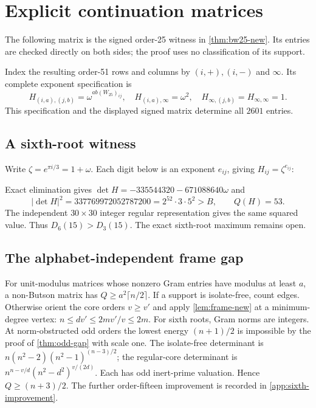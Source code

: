 \section{Explicit continuation matrices}\label{app:explicit-new}
The following matrix is the signed order-25 witness in \cref{thm:bw25-new}. Its entries are checked directly on both sides; the proof uses no classification of its support.
\begin{center}
\setlength{\arraycolsep}{1.5pt}
\renewcommand{\arraystretch}{1.02}
\scriptsize

\end{center}
Index the resulting order-51 rows and columns by $(i,+),(i,-)$ and $\infty$. Its complete exponent specification is
\[H_{(i,a),(j,b)}=\omega^{ab(W_{25})_{ij}},\quad H_{(i,a),\infty}=\omega^2,\quad
 H_{\infty,(j,b)}=H_{\infty,\infty}=1.\]
This specification and the displayed signed matrix determine all $2601$ entries.

\subsection{A sixth-root witness}
Write $\zeta=e^{\pi i/3}=1+\omega$. Each digit below is an exponent $e_{ij}$, giving $H_{ij}=\zeta^{e_{ij}}$:
\begin{center}\ttfamily\small

\end{center}
Exact elimination gives $\det H=-335544320-671088640\omega$ and
\[|\det H|^2=337769972052787200=2^{52}\cdot3\cdot5^2>B,\qquad Q(H)=53.\]
The independent $30\times30$ integer regular representation gives the same squared value. Thus $D_6(15)>D_3(15)$. The exact sixth-root maximum remains open.

\subsection{The alphabet-independent frame gap}
For unit-modulus matrices whose nonzero Gram entries have modulus at least $a$, a non-Butson matrix has $Q\ge a^2\lceil n/2\rceil$. If a support is isolate-free, count edges. Otherwise orient the core orders $v\ge v'$ and apply \cref{lem:frame-new} at a minimum-degree vertex: $n\le dv'\le2mv'/v\le2m$.
For sixth roots, Gram norms are integers. At norm-obstructed odd orders the lowest energy $(n+1)/2$ is impossible by the proof of \cref{thm:odd-gap} with scale one. The isolate-free determinant is $n(n^2-2)(n^2-1)^{(n-3)/2}$; the regular-core determinant is $n^{n-v/d}(n^2-d^2)^{v/(2d)}$. Each has odd inert-prime valuation. Hence $Q\ge(n+3)/2$. The further order-fifteen improvement is recorded in \cref{app:sixth-improvement}.
